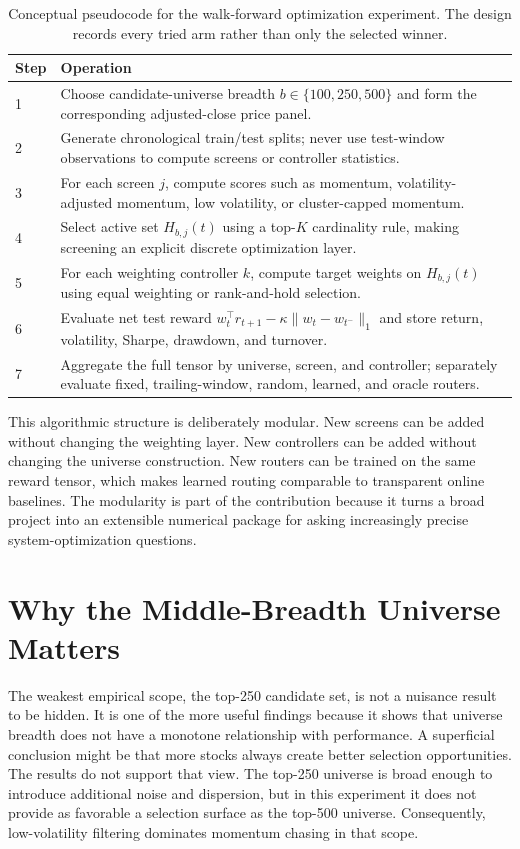 \documentclass[journal,10pt]{IEEEtran}
\begin{document}
\begin{table}[!t]
\centering
\caption{Conceptual pseudocode for the walk-forward optimization experiment. The design records every tried arm rather than only the selected winner.}
\label{tab:pseudocode}
\small
\begin{tabularx}{\textwidth}{p{}X}
\toprule
Step & Operation \\
\midrule
1 & Choose candidate-universe breadth $b\in\{100,250,500\}$ and form the corresponding adjusted-close price panel.\\
2 & Generate chronological train/test splits; never use test-window observations to compute screens or controller statistics.\\
3 & For each screen $j$, compute scores such as momentum, volatility-adjusted momentum, low volatility, or cluster-capped momentum.\\
4 & Select active set $H_{b,j}(t)$ using a top-$K$ cardinality rule, making screening an explicit discrete optimization layer.\\
5 & For each weighting controller $k$, compute target weights on $H_{b,j}(t)$ using equal weighting or rank-and-hold selection.\\
6 & Evaluate net test reward $w_t^\top r_{t+1}-\kappa\|w_t-w_{t^-}\|_1$ and store return, volatility, Sharpe, drawdown, and turnover.\\
7 & Aggregate the full tensor by universe, screen, and controller; separately evaluate fixed, trailing-window, random, learned, and oracle routers.\\
\bottomrule
\end{tabularx}
\end{table}

This algorithmic structure is deliberately modular. New screens can be added without changing the weighting layer. New controllers can be added without changing the universe construction. New routers can be trained on the same reward tensor, which makes learned routing comparable to transparent online baselines. The modularity is part of the contribution because it turns a broad project into an extensible numerical package for asking increasingly precise system-optimization questions.

\section{Why the Middle-Breadth Universe Matters}
The weakest empirical scope, the top-250 candidate set, is not a nuisance result to be hidden. It is one of the more useful findings because it shows that universe breadth does not have a monotone relationship with performance. A superficial conclusion might be that more stocks always create better selection opportunities. The results do not support that view. The top-250 universe is broad enough to introduce additional noise and dispersion, but in this experiment it does not provide as favorable a selection surface as the top-500 universe. Consequently, low-volatility filtering dominates momentum chasing in that scope.
\end{document}
